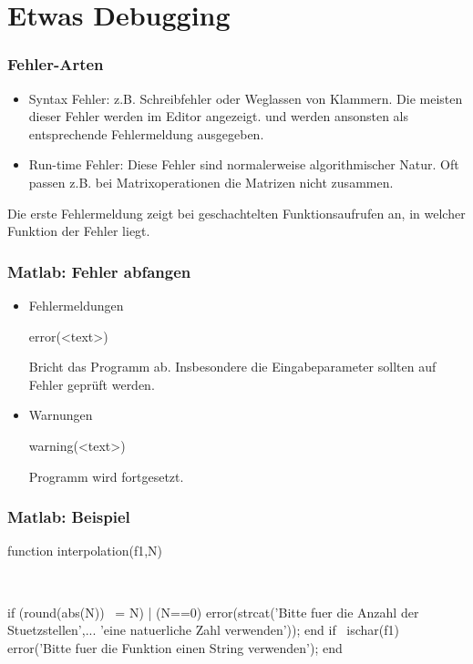 \documentclass[hyperref={xetex}]{beamer}
\begin{document}
\section{Etwas Debugging}
%
%
\begin{frame}[fragile]\frametitle{Fehler-Arten}
\begin{itemize}
\item \alert{ Syntax Fehler}: z.B. Schreibfehler oder
  Weglassen von Klammern. Die meisten dieser Fehler werden im Editor angezeigt. 
  und werden ansonsten als entsprechende Fehlermeldung ausgegeben. 
\item \alert{ Run-time Fehler}: Diese Fehler sind
  normalerweise algorithmischer Natur. Oft passen z.B. bei
  Matrixoperationen die Matrizen nicht zusammen.
\end{itemize}

\scriptsize{ Die erste Fehlermeldung zeigt bei geschachtelten Funktionsaufrufen
an, in welcher Funktion der Fehler liegt.}
\end{frame}
%
%
\begin{frame}[fragile]\frametitle{Matlab: Fehler abfangen}
\begin{itemize}
\item \alert{Fehlermeldungen}
\begin{matlabin}
error(<text>) 
\end{matlabin}
Bricht das Programm ab. Insbesondere die Eingabeparameter sollten auf Fehler geprüft werden.
\item \alert{Warnungen}
\begin{matlabin}
warning(<text>)
\end{matlabin}
Programm wird fortgesetzt.
\end{itemize}
\end{frame}
%
%
\begin{frame}[fragile]\frametitle{Matlab: Beispiel}
\begin{matlabin}
function interpolation(f1,N)
\end{matlabin}
\alert{ \centering{$\cdots$}}\\
\begin{matlabin}
if (round(abs(N)) ~= N) | (N==0)
    error(strcat('Bitte fuer die Anzahl der Stuetzstellen',...
    'eine natuerliche Zahl verwenden'));
end
if ~ischar(f1)
    error('Bitte fuer die Funktion einen String verwenden');
end
\end{matlabin}
\end{frame}
\end{document}
